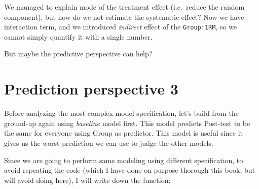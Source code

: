 \documentclass[
]{book}
\newenvironment{Shaded}{\begin{snugshade}}{\end{snugshade}}
\newcommand{\CommentTok}[1]{\textcolor[rgb]{0.56,0.35,0.01}{\textit{#1}}}
\newcommand{\DataTypeTok}[1]{\textcolor[rgb]{0.13,0.29,0.53}{#1}}
\newcommand{\DecValTok}[1]{\textcolor[rgb]{0.00,0.00,0.81}{#1}}
\newcommand{\KeywordTok}[1]{\textcolor[rgb]{0.13,0.29,0.53}{\textbf{#1}}}
\newcommand{\NormalTok}[1]{#1}
\newcommand{\OperatorTok}[1]{\textcolor[rgb]{0.81,0.36,0.00}{\textbf{#1}}}
\newcommand{\StringTok}[1]{\textcolor[rgb]{0.31,0.60,0.02}{#1}}
\begin{document}
\begin{Shaded}
\end{Shaded}

We managed to explain mode of the treatment effect (i.e.~reduce the random component), but how do we not estimate the systematic effect? Now we have interaction term, and we introduced \emph{indirect} effect of the \texttt{Group:1RM}, so we cannot simply quantify it with a single number.

But maybe the predictive perspective can help?

\hypertarget{prediction-perspective-3}{%
\section{Prediction perspective 3}\label{prediction-perspective-3}}

Before analyzing the most complex model specification, let's build from the ground-up again using \emph{baseline} model first. This model predicts Post-test to be the same for everyone using Group as predictor. This model is useful since it gives us the worst prediction we can use to judge the other models.

Since we are going to perform same modeling using different specification, to avoid repeating the code (which I have done on purpose thorough this book, but will avoid doing here), I will write down the function:
\end{document}
